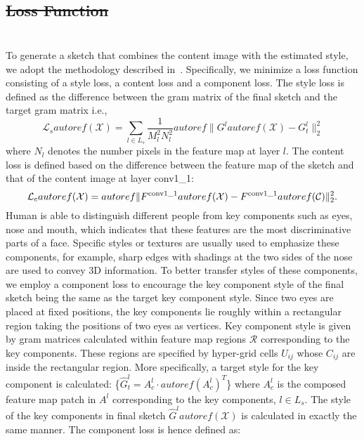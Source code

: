\documentclass[10pt,twocolumn,letterpaper]{article}
\providecommand{\DIFaddtex}[1]{{\protect\color{blue}\uwave{#1}}} %
\providecommand{\DIFdeltex}[1]{{\protect\color{red}\sout{#1}}}                      %
\providecommand{\DIFaddbegin}{} %
\providecommand{\DIFaddend}{} %
\providecommand{\DIFdelbegin}{} %
\providecommand{\DIFdelend}{} %
\providecommand{\DIFadd}[1]{\texorpdfstring{\DIFaddtex{#1}}{#1}} %
\providecommand{\DIFdel}[1]{\texorpdfstring{\DIFdeltex{#1}}{}} %
\begin{document}
{
\DIFdelbegin \subsection{\DIFdel{Loss Function}}
\addtocounter{subsection}{-1}%
\DIFdelend \DIFaddbegin \section{\DIFadd{Combine Style with Content}}
\DIFaddend }
To generate a sketch that combines the content image with the estimated style, we adopt the methodology described in~\cite{gatys2015texture}. Specifically, we minimize a loss function consisting of a style loss, a content loss and a component loss. The style loss is defined as the difference between the gram matrix of the final sketch and the target gram matrix i.e.,
\begin{equation}
\mathcal{L}_{s} autoref( \mathcal{X} ) = \sum\limits_{l \in {L_s}} {\frac{1}{{M_l^2N_l^2}}autoref\| {{G^l}autoref( \mathcal{X} ) - G_t^l} \|_2^2} 
\label{eq:Gram_loss}
\end{equation}
where $N_l$ denotes the number pixels in the feature map at layer $l$. The content loss is defined based on the difference between the feature map of the sketch and that of the content image at layer conv1\_1:
\begin{equation}
\mathcal{L}_{c}autoref( \mathcal{X} ) = autoref\| {{F^{\rm{conv1\_1}}}autoref( \mathcal{X} ) - {F^{\rm{conv1\_1}}}autoref( \mathcal{C} )} \|_2^2.
\label{eq:Style_loss}
\end{equation}
Human is able to distinguish different people from key components such as eyes, nose and mouth, which indicates that these features are the most discriminative parts of a face. Specific styles or textures are usually used to emphasize these components, for example, sharp edges with shadings at the two sides of the nose are used to convey 3D information. To better transfer styles of these components, we employ a component loss to encourage the key component style of the final sketch being the same as the target key component style. Since two eyes are placed at fixed positions, the key components lie roughly within a rectangular region taking the positions of two eyes as vertices. Key component style is given by gram matrices calculated within feature map regions $\mathcal R$ corresponding to the key components. These regions are specified by hyper-grid cells $U_{ij}$ whose $C_{ij}$ are inside the rectangular region. More specifically, a target style for the key component is calculated: \{${\hat G}_{t}^l ={A}_{c}^l \cdot {autoref( {{{A}_{c}^l}} )^T}$\} where ${A}_{c}^l$ is the composed feature map patch in $A^{l}$ corresponding to the key components, $l\in L_s$. The style of the key components in final sketch ${\hat G}^lautoref( \mathcal{X} ) $ is calculated in exactly the same manner. The component loss is hence defined as:
\end{document}
